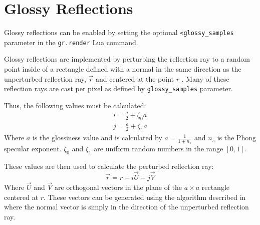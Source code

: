 \section{Glossy Reflections}

Glossy reflections can be enabled by setting the optional 
\newline \verb|<glossy_samples| parameter in the 
\verb|gr.render| Lua command.

Glossy reflections are implemented by perturbing the reflection ray to a random
point inside of a rectangle defined with a normal in the same direction as the
unperturbed reflection ray, $\vec{r}$ and centered at the point $r$ 
\cite{12_shirley_marschner_2009}. Many of these reflection rays are cast per 
pixel as defined by \verb|glossy_samples| parameter.

Thus, the following values must be calculated:
\begin{equation}
\begin{split}
  i = \frac{a}{2} + \zeta_{0}a \\
  j = \frac{a}{2} + \zeta_{1}a
\end{split}
\end{equation}
Where $a$ is the glossiness value and is calculated by $a = \frac{1}{1 + n_{s}}$
and $n_{s}$ is the Phong specular exponent. $\zeta_{0}$ and $\zeta_{1}$ are
uniform random numbers in the range $[0, 1]$.

These values are then used to calculate the perturbed reflection ray:
\begin{equation}
  \vec{r} = r + i\vec{U} + j\vec{V}
\end{equation}
Where $\vec{U}$ and $\vec{V}$ are orthogonal vectors in the plane of the
$a\times a$ rectangle centered at $r$. These vectors can be generated using the
algorithm described in \cite{6_hughes_möller_2005} where the normal vector is
simply in the direction of the unperturbed reflection ray.

